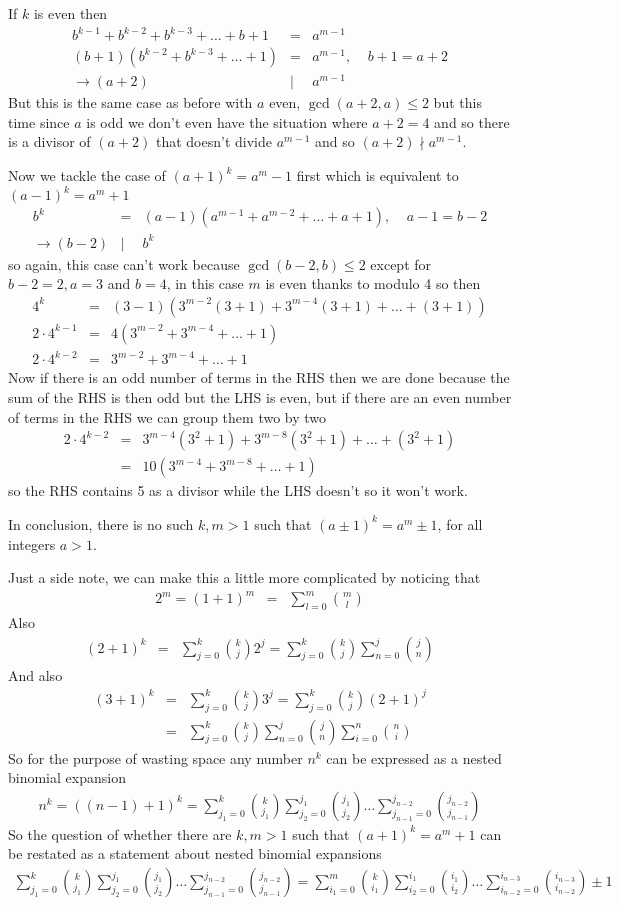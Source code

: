 \documentclass[aps,preprint,preprintnumbers,nofootinbib,showpacs,prd]{revtex4-1}
\newcommand{\nbea}{\begin{eqnarray*}}
\newcommand{\neea}{\end{eqnarray*}}
\begin{document}
If $k$ is even then
%
\nbea
b^{k-1} + b^{k-2} + b^{k-3} + \dots + b + 1 & = & a^{m-1} \\
(b + 1)(b^{k-2} + b^{k-3} + \dots + 1 )& = & a^{m-1}, ~~~~~ b + 1 = a + 2 \\
\to (a + 2) & | & a^{m-1}
\neea
%
But this is the same case as before with $a$ even, $\gcd(a+2,a) \le 2$ but this time since $a$ is odd we don't even have the situation where $a + 2 = 4$ and so there is a divisor of $(a + 2)$ that doesn't divide $a^{m - 1}$ and so $(a+2)\nmid a^{m-1}$.

Now we tackle the case of $(a+1)^k = a^m - 1$ first which is equivalent to $(a - 1)^k = a^m + 1$
%
\nbea
b^k & = & (a-1)(a^{m-1} + a^{m-2} + \dots + a + 1), ~~~~~ a - 1 = b - 2 \\
\to (b-2) & | & b^k
\neea
%
so again, this case can't work because $\gcd(b-2,b) \le 2$ except for $b-2=2, a = 3$ and $b = 4$, in this case $m$ is even thanks to modulo 4 so then
%
\nbea
4^k & = & (3-1)(3^{m-2}(3 + 1) + 3^{m-4}(3 + 1) + \dots + (3 + 1)) \\
2 \cdot 4^{k-1} & = & 4 (3^{m-2} + 3^{m-4} + \dots + 1) \\
2 \cdot 4^{k-2} & = & 3^{m-2} + 3^{m-4} + \dots + 1
\neea
%
Now if there is an odd number of terms in the RHS then we are done because the sum of the RHS is then odd but the LHS is even, but if there are an even number of terms in the RHS we can group them two by two
%
\nbea
2 \cdot 4^{k-2} & = & 3^{m-4}(3^2 + 1) + 3^{m-8}(3^2 + 1) + \dots + (3^2 + 1) \\
& = & 10(3^{m-4} + 3^{m-8} + \dots + 1)
\neea
%
so the RHS contains 5 as a divisor while the LHS doesn't so it won't work.

In conclusion, there is no such $k,m > 1$ such that $(a \pm 1)^k = a^m \pm 1$, for all integers $a > 1$.

Just a side note, we can make this a little more complicated by noticing that
%
\nbea
2^m  = (1 + 1)^m & = & \sum_{l = 0}^m \binom{m}{l}
\neea
%
Also
%
\nbea
(2 + 1)^k & = & \sum_{j = 0}^k\binom{k}{j} 2^j = \sum_{j = 0}^k\binom{k}{j} \sum_{n=0}^j\binom{j}{n}
\neea
%
And also
%
\nbea
(3 + 1)^k & = & \sum_{j = 0}^k\binom{k}{j} 3^j = \sum_{j = 0}^k\binom{k}{j} (2 + 1)^j \\
& = & \sum_{j = 0}^k\binom{k}{j} \sum_{n = 0}^j\binom{j}{n} \sum_{i=0}^n\binom{n}{i}
\neea
%
So for the purpose of wasting space any number $n^k$ can be expressed as a nested binomial expansion
%
\nbea
n^k = ((n-1) + 1)^k = \sum_{j_1 = 0}^k\binom{k}{j_1} \sum_{j_2=0}^{j_1}\binom{j_1}{j_2} \dots \sum_{j_{n-1}=0}^{j_{n-2}}\binom{j_{n-2}}{j_{n-1}}
\neea
%
So the question of whether there are $k,m > 1$ such that $(a+1)^k = a^m + 1$ can be restated as a statement about nested binomial expansions
%
\nbea
\sum_{j_1 = 0}^k\binom{k}{j_1} \sum_{j_2=0}^{j_1}\binom{j_1}{j_2} \dots \sum_{j_{n-1}=0}^{j_{n-2}}\binom{j_{n-2}}{j_{n-1}} = \sum_{i_1 = 0}^m\binom{k}{i_1} \sum_{i_2=0}^{i_1}\binom{i_1}{i_2} \dots \sum_{i_{n-2}=0}^{i_{n-3}}\binom{i_{n-3}}{i_{n-2}} \pm 1
\neea
%
\end{document}
